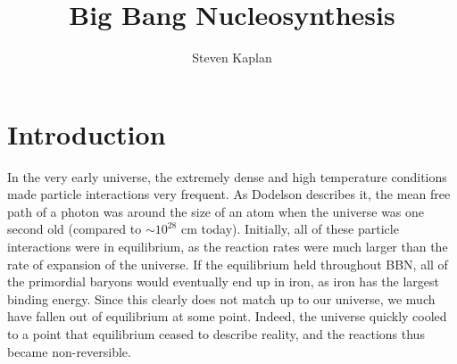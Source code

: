 \documentclass[aps,reprint,prl]{revtex4-1}
\begin{document}
\title{Big Bang Nucleosynthesis}
\author{Steven Kaplan}

\begin{abstract}
\end{abstract}

\maketitle
\nocite{*} %
\section*{Introduction}
In the very early universe, the extremely dense and high temperature conditions made particle interactions very frequent.  As Dodelson \cite{Dodelson} describes it, the mean free path of a photon was around the size of an atom when the universe was one second old (compared to $\sim10^{28}$ cm today).  Initially, all of these particle interactions were in equilibrium, as the reaction rates were much larger than the rate of expansion of the universe.  If the equilibrium held throughout BBN, all of the primordial baryons would eventually end up in iron, as iron has the largest binding energy.  Since this clearly does not match up to our universe, we much have fallen out of equilibrium at some point.  Indeed, the universe quickly cooled to a point that equilibrium ceased to describe reality, and the reactions thus became non-reversible.  
\\ \\
\end{document}
